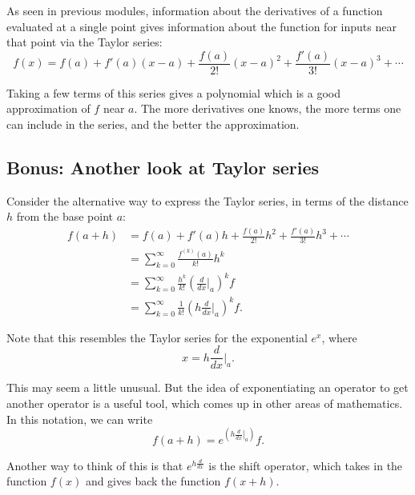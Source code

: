 \documentclass[twoside,openright,titlepage,a4paper]{book}
\begin{document}
\begin{sloppypar}
As seen in previous modules, information about the derivatives of a function evaluated at a single point gives information about the function for inputs near that point via the Taylor series:
\[ f(x) = f(a) + f'(a)(x-a) + \frac{f(a)}{2!} (x-a)^2 + \frac{f'(a)}{3!}(x-a)^3 + \dotsb \]

Taking a few terms of this series gives a polynomial which is a good approximation of $f$ near $a$. The more derivatives one knows, the more terms one can include in the series, and the better the approximation.

\subsection{Bonus: Another look at Taylor series}

Consider the alternative way to express the Taylor series, in terms of the distance $h$ from the base point $a$:
\begin{align*}
f(a+h) &= f(a) + f'(a)h + \frac{f(a)}{2!}h^2 + \frac{f'(a)}{3!}h^3 + \dotsb \\
&= \sum_{k=0}^\infty \frac{f^{\left(k\right)}(a)}{k!}h^k \\
&= \sum_{k=0}^\infty \frac{h^k}{k!} \left(\frac{d}{dx} \bigg|_a \right)^k f \\
&= \sum_{k=0}^\infty \frac{1}{k!} \left(h \frac{d}{dx} \bigg|_a \right)^k f. 
\end{align*}

Note that this resembles the Taylor series for the exponential $e^x$, where \[ x = h \frac{d}{dx} \bigg|_a. \]

This may seem a little unusual. But the idea of exponentiating an operator to get another operator is a useful tool, which comes up in other areas of mathematics. In this notation, we can write \[ f(a+h) = e^{\left(h\left.\frac{d}{dx}\right|_a\right)} f. \]

Another way to think of this is that $e^{h \frac{d}{dx}}$ is the shift operator, which takes in the function $f(x)$ and gives back the function $f(x+h)$.


\end{sloppypar}
\end{document}
